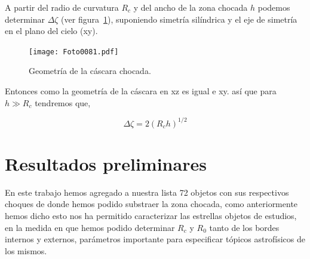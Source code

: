 \documentclass{article}
\begin{document}
A partir del radio de curvatura \(R_{c}\) y del ancho de la zona chocada \(h\) podemos determinar \(\Delta \zeta\) (ver figura~\ref{fig:geometria}), suponiendo simetría silíndrica y el eje de simetría en el plano del cielo (xy).\\

\begin{figure}
  \centering
  \texttt{[image: Foto0081.pdf]}
  \caption{Geometría de la cáscara chocada.}
  \label{fig:geometria}
\end{figure}

Entonces como la geometría de la cáscara en xz es igual e xy.  así que para \(h \gg R_{c}\) tendremos que,

\begin{equation}
  \label{eq:vision}
  \Delta \zeta = 2(R_{c}h)^{1/2}
\end{equation}

\section{ Resultados preliminares}
\label{sec:resultado}

En este trabajo hemos agregado a nuestra lista 72 objetos con sus respectivos choques de donde hemos podido substraer la zona chocada, como anteriormente hemos dicho esto nos ha permitido caracterizar las estrellas objetos de estudios, en la medida en que hemos podido determinar \(R_{c}\) y \(R_{0}\) tanto de los bordes internos y externos, parámetros importante para especificar tópicos astrofísicos de los mismos.\\
\end{document}
